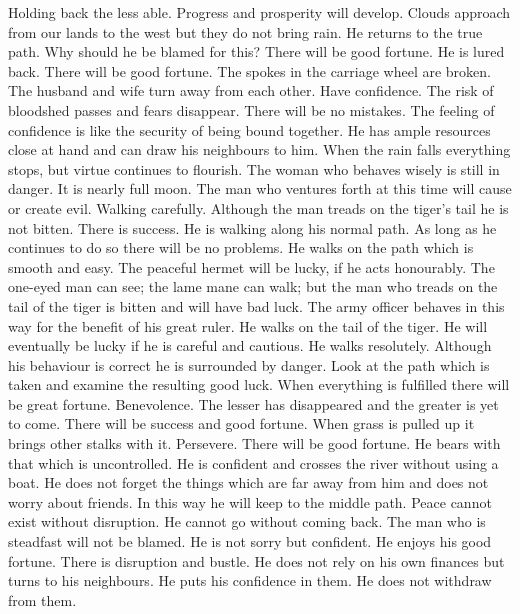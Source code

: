 \or {}
	{Holding back the less able. Progress and prosperity will develop. Clouds approach from
		our lands to the west but they do not bring rain.}
	{He returns to the true path. Why should he be blamed for this? There will be good fortune.}
	{He is lured back. There will be good fortune.}
	{The spokes in the carriage wheel are broken. The husband and wife turn away from each other.}
	{Have confidence. The risk of bloodshed passes and fears disappear. There will be no mistakes.}
	{The feeling of confidence is like the security of being bound together. He has ample
		resources close at hand and can draw his neighbours to him.}
	{When the rain falls everything stops, but virtue continues to flourish. The woman who
		behaves wisely is still in danger. It is nearly full moon. The man who ventures
		forth at this time will cause or create evil.}
\or {}
	{Walking carefully. Although the man treads on the tiger's tail he is not bitten. There is success.}
	{He is walking along his normal path. As long as he continues to do so there will be no problems.}
	{He walks on the path which is smooth and easy. The peaceful hermet will be lucky,
		if he acts honourably.}
	{The one-eyed man can see; the lame mane can walk; but the man who treads on the tail of
		the tiger is bitten and will have bad luck. The army officer behaves in this way for the
		benefit of his great ruler.}
	{He walks on the tail of the tiger. He will eventually be lucky if he is careful
		and cautious.}
	{He walks resolutely. Although his behaviour is correct he is surrounded by danger.}
	{Look at the path which is taken and examine the resulting good luck. When everything
		is fulfilled there will be great fortune.}
\or {}
	{Benevolence. The lesser has disappeared and the greater is yet to come. There will be
		success and good fortune.}
	{When grass is pulled up it brings other stalks with it. Persevere. There will be good fortune.}
	{He bears with that which is uncontrolled. He is confident and crosses the river without
		using a boat. He does not forget the things which are far away from him and does not
		worry about friends. In this way he will keep to the middle path.}
	{Peace cannot exist without disruption. He cannot go without coming back. The man who is
		steadfast will not be blamed. He is not sorry but confident. He enjoys his good fortune.}
	{There is disruption and bustle. He does not rely on his own finances but turns to his
		neighbours. He puts his confidence in them. He does not withdraw from them.}
